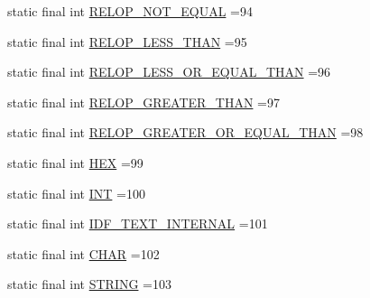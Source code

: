 \begin{DoxyCompactItemize}
\item 
static final int \hyperlink{classgov_1_1nasa_1_1jpf_1_1inspector_1_1server_1_1expression_1_1parser_1_1_expression_grammar_parser_a482f4053935d59a38de5280c50ee0db7}{R\+E\+L\+O\+P\+\_\+\+N\+O\+T\+\_\+\+E\+Q\+U\+AL} =94
\item 
static final int \hyperlink{classgov_1_1nasa_1_1jpf_1_1inspector_1_1server_1_1expression_1_1parser_1_1_expression_grammar_parser_a81a2f58d063f0633a0d43a1a33e5c041}{R\+E\+L\+O\+P\+\_\+\+L\+E\+S\+S\+\_\+\+T\+H\+AN} =95
\item 
static final int \hyperlink{classgov_1_1nasa_1_1jpf_1_1inspector_1_1server_1_1expression_1_1parser_1_1_expression_grammar_parser_abc6b4a692c2a82724b6df374917bb72c}{R\+E\+L\+O\+P\+\_\+\+L\+E\+S\+S\+\_\+\+O\+R\+\_\+\+E\+Q\+U\+A\+L\+\_\+\+T\+H\+AN} =96
\item 
static final int \hyperlink{classgov_1_1nasa_1_1jpf_1_1inspector_1_1server_1_1expression_1_1parser_1_1_expression_grammar_parser_a3083d9d5cf60ca2999a4dec947ec9c51}{R\+E\+L\+O\+P\+\_\+\+G\+R\+E\+A\+T\+E\+R\+\_\+\+T\+H\+AN} =97
\item 
static final int \hyperlink{classgov_1_1nasa_1_1jpf_1_1inspector_1_1server_1_1expression_1_1parser_1_1_expression_grammar_parser_a868060e39fb474baa28ab224b9cfc60b}{R\+E\+L\+O\+P\+\_\+\+G\+R\+E\+A\+T\+E\+R\+\_\+\+O\+R\+\_\+\+E\+Q\+U\+A\+L\+\_\+\+T\+H\+AN} =98
\item 
static final int \hyperlink{classgov_1_1nasa_1_1jpf_1_1inspector_1_1server_1_1expression_1_1parser_1_1_expression_grammar_parser_a2bf4c84c02efe74c7277b2b9620cb5eb}{H\+EX} =99
\item 
static final int \hyperlink{classgov_1_1nasa_1_1jpf_1_1inspector_1_1server_1_1expression_1_1parser_1_1_expression_grammar_parser_a1bdfbceb153b6e211c1a5826489927d5}{I\+NT} =100
\item 
static final int \hyperlink{classgov_1_1nasa_1_1jpf_1_1inspector_1_1server_1_1expression_1_1parser_1_1_expression_grammar_parser_a015ea22ff7936f8b5cc0e96502fd3abc}{I\+D\+F\+\_\+\+T\+E\+X\+T\+\_\+\+I\+N\+T\+E\+R\+N\+AL} =101
\item 
static final int \hyperlink{classgov_1_1nasa_1_1jpf_1_1inspector_1_1server_1_1expression_1_1parser_1_1_expression_grammar_parser_ae0c3b565aaa2dc68a443f27a6e21b14c}{C\+H\+AR} =102
\item 
static final int \hyperlink{classgov_1_1nasa_1_1jpf_1_1inspector_1_1server_1_1expression_1_1parser_1_1_expression_grammar_parser_ad80dacdbb6cc17d04d47e898656647e2}{S\+T\+R\+I\+NG} =103
\item 

\end{DoxyCompactItemize}
